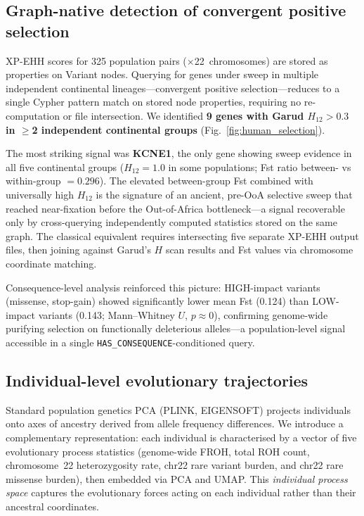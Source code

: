 \subsection*{Graph-native detection of convergent positive selection}

XP-EHH scores for 325 population pairs ($\times$22~chromosomes) are stored as properties on Variant nodes. Querying for genes under sweep in multiple independent continental lineages---convergent positive selection---reduces to a single Cypher pattern match on stored node properties, requiring no re-computation or file intersection. We identified \textbf{9 genes with Garud $H_{12} > 0.3$ in $\geq$2 independent continental groups} (Fig.~\ref{fig:human_selection}).

The most striking signal was \textbf{KCNE1}, the only gene showing sweep evidence in all five continental groups ($H_{12} = 1.0$ in some populations; Fst ratio between- vs within-group $= 0.296$). The elevated between-group Fst combined with universally high $H_{12}$ is the signature of an ancient, pre-OoA selective sweep that reached near-fixation before the Out-of-Africa bottleneck\cite{sabeti2007genome}---a signal recoverable only by cross-querying independently computed statistics stored on the same graph. The classical equivalent requires intersecting five separate XP-EHH output files, then joining against Garud's $H$ scan results and Fst values via chromosome coordinate matching.

Consequence-level analysis reinforced this picture: HIGH-impact variants (missense, stop-gain) showed significantly lower mean Fst (0.124) than LOW-impact variants (0.143; Mann--Whitney $U$, $p \approx 0$), confirming genome-wide purifying selection on functionally deleterious alleles---a population-level signal accessible in a single \texttt{HAS\_CONSEQUENCE}-conditioned query.

\subsection*{Individual-level evolutionary trajectories}

Standard population genetics PCA (PLINK, EIGENSOFT) projects individuals onto axes of ancestry derived from allele frequency differences. We introduce a complementary representation: each individual is characterised by a vector of five evolutionary process statistics (genome-wide FROH, total ROH count, chromosome~22 heterozygosity rate, chr22 rare variant burden, and chr22 rare missense burden), then embedded via PCA and UMAP. This \emph{individual process space} captures the evolutionary forces acting on each individual rather than their ancestral coordinates.

